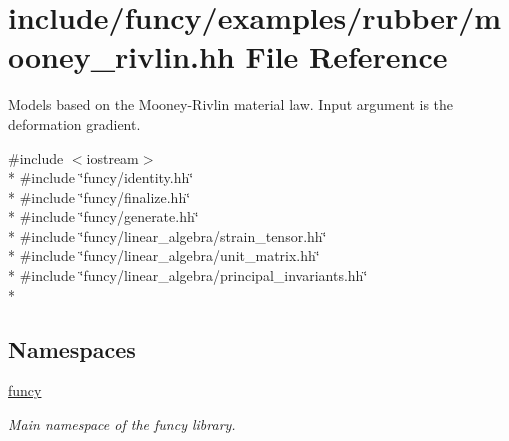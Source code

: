 \hypertarget{mooney__rivlin_8hh}{\section{include/funcy/examples/rubber/mooney\-\_\-rivlin.hh File Reference}
\label{mooney__rivlin_8hh}
}


Models based on the Mooney-\/\-Rivlin material law. Input argument is the deformation gradient.  


{\ttfamily \#include $<$iostream$>$}\\*
{\ttfamily \#include \char`\"{}funcy/identity.\-hh\char`\"{}}\\*
{\ttfamily \#include \char`\"{}funcy/finalize.\-hh\char`\"{}}\\*
{\ttfamily \#include \char`\"{}funcy/generate.\-hh\char`\"{}}\\*
{\ttfamily \#include \char`\"{}funcy/linear\-\_\-algebra/strain\-\_\-tensor.\-hh\char`\"{}}\\*
{\ttfamily \#include \char`\"{}funcy/linear\-\_\-algebra/unit\-\_\-matrix.\-hh\char`\"{}}\\*
{\ttfamily \#include \char`\"{}funcy/linear\-\_\-algebra/principal\-\_\-invariants.\-hh\char`\"{}}\\*
\subsection*{Namespaces}
\begin{DoxyCompactItemize}
\item 
\hyperlink{namespacefuncy}{funcy}
\begin{DoxyCompactList}\small\item\em Main namespace of the funcy library. \end{DoxyCompactList}\end{DoxyCompactItemize}
